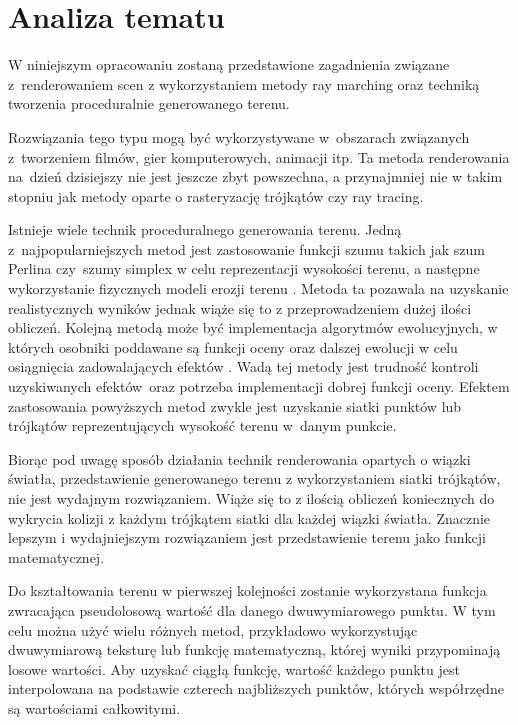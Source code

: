 \chapter{Analiza tematu}

W niniejszym opracowaniu zostaną przedstawione zagadnienia związane z~renderowaniem scen z wykorzystaniem metody ray marching oraz techniką tworzenia proceduralnie generowanego terenu.

Rozwiązania tego typu mogą być wykorzystywane w~obszarach związanych z~tworzeniem filmów, gier komputerowych, animacji itp. Ta metoda renderowania na~dzień dzisiejszy nie jest jeszcze zbyt powszechna, a przynajmniej nie w takim stopniu jak metody oparte o rasteryzację trójkątów czy ray tracing.

Istnieje wiele technik proceduralnego generowania terenu\cite{bib:aaptg}. Jedną z~najpopularniejszych metod jest zastosowanie funkcji szumu takich jak szum Perlina czy~szumy simplex w celu reprezentacji wysokości terenu, a następne wykorzystanie fizycznych modeli erozji terenu \cite{bib:phys}\cite{bib:ptg}. Metoda ta pozawala na uzyskanie realistycznych wyników jednak wiąże się to z przeprowadzeniem dużej ilości obliczeń. Kolejną metodą może być implementacja algorytmów ewolucyjnych, w których osobniki poddawane są funkcji oceny oraz dalszej ewolucji w celu osiągnięcia zadowalających efektów \cite{bib:evo}. Wadą tej metody jest trudność kontroli uzyskiwanych efektów~oraz potrzeba implementacji dobrej funkcji oceny. Efektem zastosowania powyższych metod zwykle jest uzyskanie siatki punktów lub trójkątów reprezentujących wysokość terenu w~danym punkcie.

Biorąc pod uwagę sposób działania technik renderowania opartych o wiązki światła, przedstawienie generowanego terenu z wykorzystaniem siatki trójkątów, nie jest wydajnym rozwiązaniem. Wiąże się to z ilością obliczeń koniecznych do wykrycia kolizji z każdym trójkątem siatki dla każdej wiązki światła. Znacznie lepszym  i wydajniejszym rozwiązaniem jest przedstawienie terenu jako funkcji matematycznej.

Do kształtowania terenu w pierwszej kolejności zostanie wykorzystana funkcja zwracająca pseudolosową wartość dla danego dwuwymiarowego punktu\cite{bib:iqterrain}.
W tym celu można użyć wielu różnych metod, przykładowo wykorzystując dwuwymiarową teksturę
lub funkcję matematyczną, której wyniki przypominają losowe wartości. Aby uzyskać ciągłą funkcję, wartość każdego punktu jest interpolowana na podstawie czterech najbliższych punktów, których współrzędne są wartościami całkowitymi.

